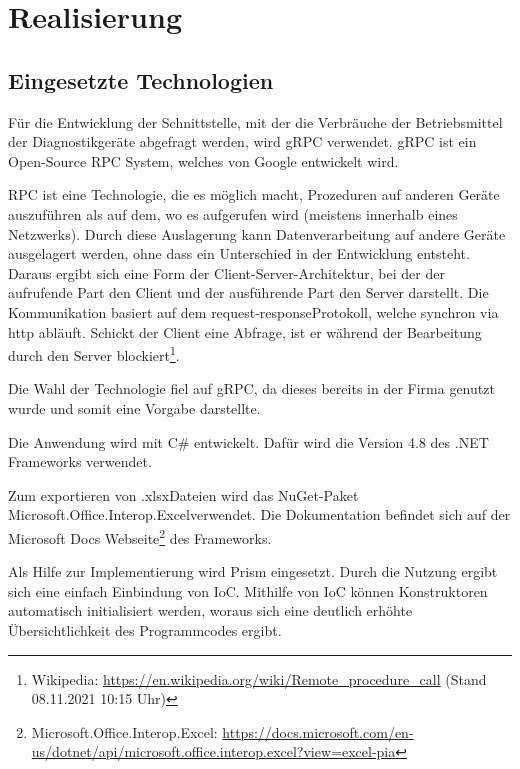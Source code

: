 \section{Realisierung}
\label{sec:Realisierung}

\subsection{Eingesetzte Technologien}
\label{sec:EingesetzteTechnologien}
Für die Entwicklung der Schnittstelle, mit der die Verbräuche der Betriebsmittel der Diagnostikgeräte abgefragt werden, wird {\acs{gRPC}} verwendet. {\acs{gRPC}} ist ein Open-Source {\acs{RPC}} System, welches von Google entwickelt wird.

{\acs{RPC}} ist eine Technologie, die es möglich macht, Prozeduren auf anderen Geräte auszuführen als auf dem, wo es aufgerufen wird (meistens innerhalb eines Netzwerks). Durch diese Auslagerung kann Datenverarbeitung auf andere Geräte ausgelagert werden, ohne dass ein Unterschied in der Entwicklung entsteht. Daraus ergibt sich eine Form der Client-Server-Architektur, bei der der aufrufende Part den Client und der ausführende Part den Server darstellt. Die Kommunikation basiert auf dem \glqq request-response\grqq \space Protokoll, welche synchron via http abläuft. Schickt der Client eine Abfrage, ist er während der Bearbeitung durch den Server blockiert\footnote{Wikipedia: \url{https://en.wikipedia.org/wiki/Remote_procedure_call} (Stand 08.11.2021 10:15 Uhr)}.

Die Wahl der Technologie fiel auf {\acs{gRPC}}, da dieses bereits in der Firma genutzt wurde und somit eine Vorgabe darstellte.

Die Anwendung wird mit C\# entwickelt. Dafür wird die Version 4.8 des .NET Frameworks verwendet.

Zum exportieren von \glqq .xlsx\grqq \space Dateien wird das {\acs{NuGet}}-Paket \glqq Microsoft.Office.Interop.Excel\grqq \space verwendet. Die Dokumentation befindet sich auf der Microsoft Docs Webseite\footnote{Microsoft.Office.Interop.Excel: \url{https://docs.microsoft.com/en-us/dotnet/api/microsoft.office.interop.excel?view=excel-pia}} des Frameworks.

Als Hilfe zur Implementierung wird {\acs{Prism}} eingesetzt. Durch die Nutzung ergibt sich eine einfach Einbindung von {\acs{IoC}}. Mithilfe von {\acs{IoC}} können Konstruktoren automatisch initialisiert werden, woraus sich eine deutlich erhöhte Übersichtlichkeit des Programmcodes ergibt.

